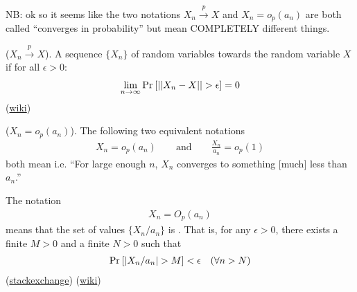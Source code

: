 \documentclass[11pt]{article}
\begin{document}
\begin{definition}
	NB: ok so it seems like the two notations $X_n \overset{p}{\to} X$ and $X_n = o_p(a_n)$ are both called ``converges in probability'' but mean COMPLETELY different things. 
	
	 ($X_n \overset{p}{\to} X$). A sequence $\{ X_n \}$ of random variables  towards the random variable $X$ if for all $\epsilon > 0$:
	\begin{align} 
		\lim_{n \to \infty} \text{Pr}_{}\left[  ||  X_n - X || > \epsilon \right] = 0 
	\end{align}
(\href{https://www.wikiwand.com/en/Convergence_of_random_variables#/Definition_2}{wiki})

	  ($X_n = o_p(a_n)$). The following two equivalent notations
	\begin{align}
		X_n = o_p(a_n) \qquad \text{and} \qquad \frac{X_n}{a_n} = o_p(1)
	\end{align}
	both mean 
	i.e. ``For large enough $n$, $X_n$ converges to something [much] less than $a_n$.''
\end{definition}

\begin{definition}[-1em][Bounded in Probability $X_n = O_p(a_n)$]
	The notation 
	\begin{align}
		X_n = O_p(a_n)
	\end{align}
	means that the set of values $\{ X_n / a_n \}$ is . That is, for any $\epsilon > 0$, there exists a finite $M >0$ and a finite $N > 0$ such that
	\begin{align}
		\text{Pr}_{}\left[ |X_n / a_n | > M \right] < \epsilon \quad (\forall n > N)
	\end{align}
(\href{https://stats.stackexchange.com/questions/155667/understanding-big-little-o-p-o-p-notation-for-estimators/155679#155679}{stackexchange}) (\href{https://www.wikiwand.com/en/Big_O_in_probability_notation#/Big_O:_stochastic_boundedness}{wiki}) 
\end{definition}
\end{document}
